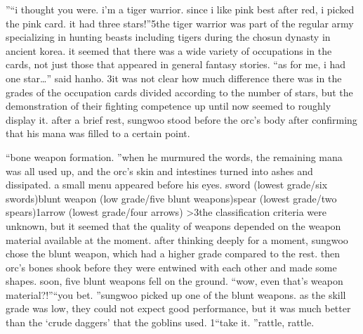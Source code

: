 ”“i thought you were.
 i’m a tiger warrior.
 since i like pink best after red, i picked the pink card.
 it had three stars!”5the tiger warrior was part of the regular army specializing in hunting beasts including tigers during the chosun dynasty in ancient korea.
it seemed that there was a wide variety of occupations in the cards, not just those that appeared in general fantasy stories.
“as for me, i had one star…” said hanho.
3it was not clear how much difference there was in the grades of the occupation cards divided according to the number of stars, but the demonstration of their fighting competence up until now seemed to roughly display it.
after a brief rest, sungwoo stood before the orc’s body after confirming that his mana was filled to a certain point.


“bone weapon formation.
”when he murmured the words, the remaining mana was all used up, and the orc’s skin and intestines turned into ashes and dissipated.
 a small menu appeared before his eyes.
sword (lowest grade/six swords)blunt weapon (low grade/five blunt weapons)spear (lowest grade/two spears)1arrow (lowest grade/four arrows) >3the classification criteria were unknown, but it seemed that the quality of weapons depended on the weapon material available at the moment.
 after thinking deeply for a moment, sungwoo chose the blunt weapon, which had a higher grade compared to the rest.
then orc’s bones shook before they were entwined with each other and made some shapes.
 soon, five blunt weapons fell on the ground.
“wow, even that’s weapon material?!”“you bet.
”sungwoo picked up one of the blunt weapons.
as the skill grade was low, they could not expect good performance, but it was much better than the ‘crude daggers’ that the goblins used.
1“take it.
”rattle, rattle.


 